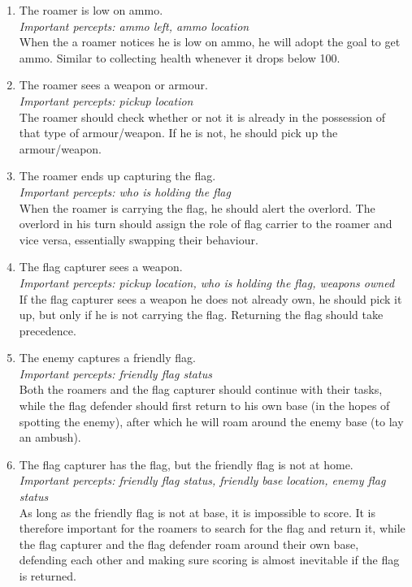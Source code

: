 \begin{enumerate}
	\item The roamer is low on ammo. \\
	\textit{Important percepts: ammo left, ammo location} \\
	When the a roamer notices he is low on ammo, he will adopt the goal to get ammo. Similar to collecting health whenever it drops below 100.\\
	\item The roamer sees a weapon or armour. \\
	\textit{Important percepts: pickup location} \\
	The roamer should check whether or not it is already in the possession of that type of armour/weapon. If he is not, he should pick up the armour/weapon.\\
	\item The roamer ends up capturing the flag. \\
	\textit{Important percepts: who is holding the flag} \\
	When the roamer is carrying the flag, he should alert the overlord. The overlord in his turn should assign the role of flag carrier to the roamer and vice versa, essentially swapping their behaviour.\\
	\item The flag capturer sees a weapon. \\
	\textit{Important percepts: pickup location, who is holding the flag, weapons owned} \\
	If the flag capturer sees a weapon he does not already own, he should pick it up, but only if he is not carrying the flag. Returning the flag should take precedence.\\
	\item The enemy captures a friendly flag. \\
	\textit{Important percepts: friendly flag status} \\
	Both the roamers and the flag capturer should continue with their tasks, while the flag defender should first return to his own base (in the hopes of spotting the enemy), after which he will roam around the enemy base (to lay an ambush). \\
	\item The flag capturer has the flag, but the friendly flag is not at home. \\
	\textit{Important percepts: friendly flag status, friendly base location, enemy flag status} \\
	As long as the friendly flag is not at base, it is impossible to score. It is therefore important for the roamers to search for the flag and return it, while the flag capturer and the flag defender roam around their own base, defending each other and making sure scoring is almost inevitable if the flag is returned. \\
\end{enumerate}